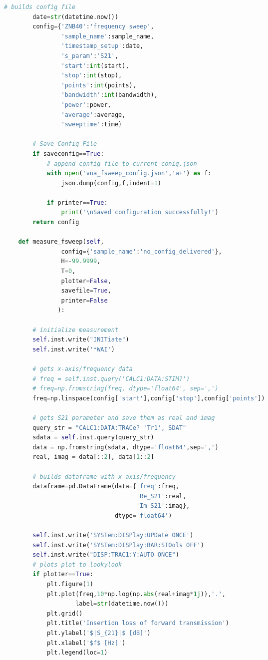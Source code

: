 \begin{landscape}
\begin{multicols}{2}
\begin{lstlisting}[language=Python]
        # builds config file
        date=str(datetime.now()) 
        config={'ZNB40':'frequency sweep',
                'sample_name':sample_name,
                'timestamp_setup':date,
                's_param':'S21',
                'start':int(start),
                'stop':int(stop),
                'points':int(points),
                'bandwidth':int(bandwidth),
                'power':power,
                'average':average,
                'sweeptime':time}
            
        # Save Config File
        if saveconfig==True:  
            # append config file to current conig.json 
            with open('vna_fsweep_config.json','a+') as f:
                json.dump(config,f,indent=1)
        
            if printer==True:
                print('\nSaved configuration successfully!')
        return config

    def measure_fsweep(self,
                config={'sample_name':'no_config_delivered'},
                H=-99.9999,
                T=0,
                plotter=False,
                savefile=True,
                printer=False
               ):        
        
        # initialize measurement
        self.inst.write("INITiate")
        self.inst.write('*WAI')
        
        # gets x-axis/frequency data
        # freq = self.inst.query('CALC1:DATA:STIM?')
        # freq=np.fromstring(freq, dtype='float64', sep=',')
        freq=np.linspace(config['start'],config['stop'],config['points'])
        
        # gets S21 parameter and save them as real and imag
        query_str = "CALC1:DATA:TRACe? 'Tr1', SDAT"
        sdata = self.inst.query(query_str)
        data = np.fromstring(sdata, dtype='float64',sep=',')
        real, imag = data[::2], data[1::2]
        
        # builds dataframe with x-axis/frequency
        dataframe=pd.DataFrame(data={'freq':freq,
                                     'Re_S21':real,
                                     'Im_S21':imag},
                               dtype='float64')
        
        self.inst.write('SYSTem:DISPlay:UPDate ONCE')
        self.inst.write('SYSTem:DISPlay:BAR:STOols OFF')
        self.inst.write("DISP:TRAC1:Y:AUTO ONCE")
        # plots plot to lookylook
        if plotter==True:
            plt.figure(1)
            plt.plot(freq,10*np.log(np.abs(real+imag*1j)),'.',
                    label=str(datetime.now()))
            plt.grid()
            plt.title('Insertion loss of forward transmission')
            plt.ylabel('$|S_{21}|$ [dB]')
            plt.xlabel('$f$ [Hz]')
            plt.legend(loc=1)
            

\end{lstlisting}
\end{multicols}
\end{landscape}
